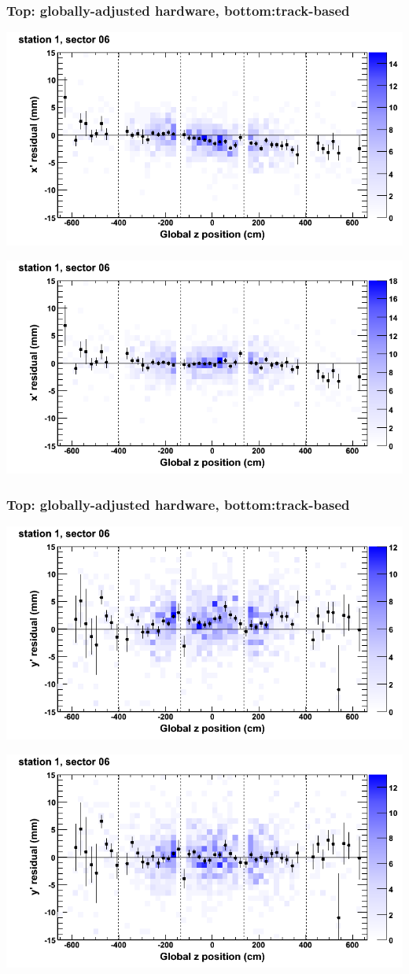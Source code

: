 \documentclass[compress]{beamer}
\begin{document}
\begin{frame}
\frametitle{Top: globally-adjusted hardware, bottom:track-based}
\includegraphics[width=0.7\linewidth]{NOV4_mapplots_HW/DTvsz_st1sec06_x.png}

\includegraphics[width=0.7\linewidth]{NOV4_mapplots/DTvsz_st1sec06_x.png}
\end{frame}

\begin{frame}
\frametitle{Top: globally-adjusted hardware, bottom:track-based}
\includegraphics[width=0.7\linewidth]{NOV4_mapplots_HW/DTvsz_st1sec06_y.png}

\includegraphics[width=0.7\linewidth]{NOV4_mapplots/DTvsz_st1sec06_y.png}
\end{frame}
\end{document}
